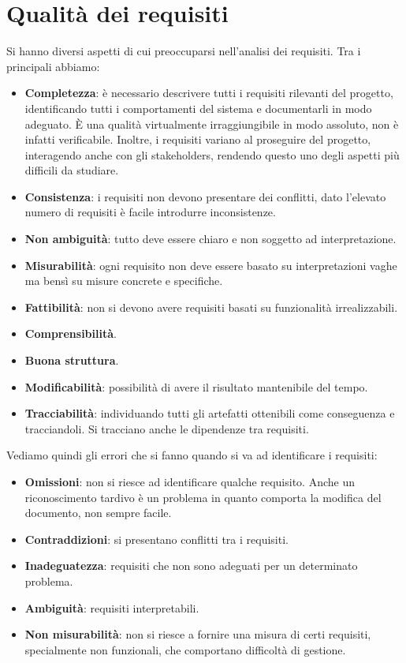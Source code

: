 \section{Qualità dei requisiti}
Si hanno diversi aspetti di cui preoccuparsi nell'analisi dei requisiti. Tra i
principali abbiamo:
\begin{itemize}
      \item \textbf{Completezza}: è necessario descrivere tutti i requisiti
            rilevanti del progetto, identificando tutti i comportamenti del
            sistema e documentarli in modo adeguato. È una qualità virtualmente
            irraggiungibile in modo assoluto, non è infatti verificabile. Inoltre,
            i requisiti variano al proseguire del progetto, interagendo anche
            con gli stakeholders, rendendo questo uno degli aspetti più difficili
            da studiare.
      \item \textbf{Consistenza}: i requisiti non devono presentare dei conflitti,
            dato l'elevato numero di requisiti è facile introdurre inconsistenze.
      \item \textbf{Non ambiguità}: tutto deve essere chiaro e non soggetto ad
            interpretazione.
      \item \textbf{Misurabilità}: ogni requisito non deve essere basato su
            interpretazioni vaghe ma bensì su misure concrete e specifiche.
      \item \textbf{Fattibilità}: non si devono avere requisiti basati su
            funzionalità irrealizzabili.
      \item \textbf{Comprensibilità}.
      \item \textbf{Buona struttura}.
      \item \textbf{Modificabilità}: possibilità di avere il risultato mantenibile
            del tempo.
      \item \textbf{Tracciabilità}: individuando tutti gli artefatti ottenibili
            come conseguenza e tracciandoli. Si tracciano anche le dipendenze
            tra requisiti.
\end{itemize}
Vediamo quindi gli errori che si fanno quando si va ad identificare i requisiti:
\begin{itemize}
      \item \textbf{Omissioni}: non si riesce ad identificare qualche requisito.
            Anche un riconoscimento tardivo è un problema in quanto comporta la
            modifica del documento, non sempre facile.
      \item \textbf{Contraddizioni}: si presentano conflitti tra i requisiti.
      \item \textbf{Inadeguatezza}: requisiti che non sono adeguati per un
            determinato problema.
      \item \textbf{Ambiguità}: requisiti interpretabili.
      \item \textbf{Non misurabilità}: non si riesce a fornire una misura di
            certi requisiti, specialmente non funzionali, che comportano
            difficoltà di gestione.
\end{itemize}
